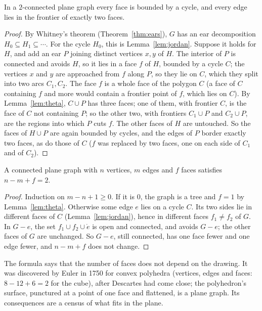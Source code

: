 \begin{proposition}\label{prop:faces}
In a $2$-connected plane graph every face is bounded by a cycle, and every edge lies in the frontier of exactly two faces.
\end{proposition}
\begin{proof}
By Whitney's theorem (Theorem~\ref{thm:ears}), $G$ has an ear decomposition $H_0\subseteq H_1\subseteq\cdots$. For the cycle $H_0$, this is Lemma~\ref{lem:jordan}.
Suppose it holds for $H$, and add an ear $P$ joining distinct vertices $x,y$ of $H$. The interior of $P$ is connected and avoids $H$, so it lies in a face $f$ of
$H$, bounded by a cycle $C$; the vertices $x$ and $y$ are approached from $f$ along $P$, so they lie on $C$, which they split into two arcs $C_1,C_2$. The face $f$ is a whole
face of the polygon $C$ (a face of $C$ containing $f$ and more would contain a frontier point of $f$, which lies on $C$). By Lemma~\ref{lem:theta}, $C\cup P$ has three faces;
one of them, with frontier $C$, is the face of $C$ not containing $P$; so the other two, with frontiers $C_1\cup P$ and $C_2\cup P$, are the regions into which $P$
cuts $f$. The other faces of $H$ are untouched. So the faces of $H\cup P$ are again bounded by cycles, and the edges of $P$ border exactly two faces, as do those
of $C$ ($f$ was replaced by two faces, one on each side of $C_1$ and of $C_2$).
\end{proof}

\begin{theorem}\label{thm:euler2}
A connected plane graph with $n$ vertices, $m$ edges and $f$ faces satisfies $n-m+f=2$.
\end{theorem}
\begin{proof}
Induction on $m-n+1\ge0$. If it is $0$, the graph is a tree and $f=1$ by Lemma~\ref{lem:theta}. Otherwise some edge $e$ lies on a cycle $C$. Its two sides lie in
different faces of $C$ (Lemma~\ref{lem:jordan}), hence in different faces $f_1\ne f_2$ of $G$. In $G-e$, the set $f_1\cup f_2\cup\mathring e$ is open and connected, and avoids
$G-e$; the other faces of $G$ are unchanged. So $G-e$, still connected, has one face fewer and one edge fewer, and $n-m+f$ does not change.
\end{proof}

The formula says that the number of faces does not depend on the drawing. It was discovered by Euler in 1750 for convex polyhedra
(vertices, edges and faces: $8-12+6=2$ for the cube), after Descartes had come close; the polyhedron's surface, punctured at a point of one face
and flattened, is a plane graph. Its consequences are a census of what fits in the plane.

